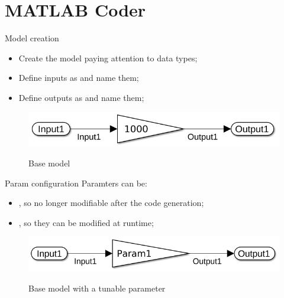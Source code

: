 
\section{MATLAB Coder}
\graphicspath{{figs/section5/}}

\begin{frame}{Model creation}
	\begin{itemize}
		\item Create the model paying attention to data types;
		\item Define inputs as  and name them;
		\item Define outputs as  and name them;
	\end{itemize}
	\vspace{0.5cm}
	\begin{figure}
		\centering
		\includegraphics[scale=0.4]{Model.png}
		\label{fig:model}
		\caption{Base model}
	\end{figure}
\end{frame}

\begin{frame}{Param configuration}
	Paramters can be:
	\begin{itemize}
		\item {}, so no longer modifiable after the code generation;
		\item {}, so they can be modified at runtime;
	\end{itemize}
	\vspace{0.5cm}
	\begin{figure}
		\centering
		\includegraphics[scale=0.4]{ModelParam.png}
		\label{fig:model_param}
		\caption{Base model with a tunable parameter}
	\end{figure}
\end{frame}


